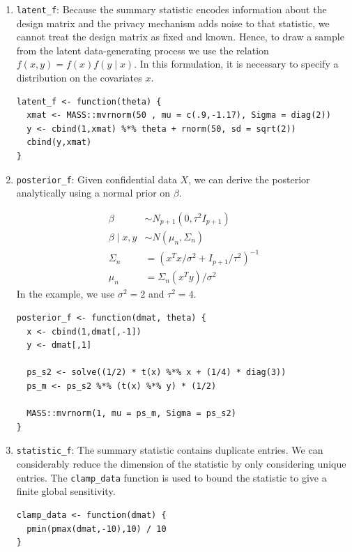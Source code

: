 \begin{enumerate}
\def\labelenumi{\arabic{enumi}.}
\item
  \texttt{latent\_f}: Because the summary statistic encodes information about the design
  matrix and the privacy mechanism adds noise to that statistic, we cannot treat the
  design matrix as fixed and known. Hence, to draw a sample from the latent data-generating
  process we use the relation \(f(x,y) = f(x)f(y \mid x)\). In this formulation,
  it is necessary to specify a distribution on the covariates \(x\).

\begin{verbatim}
latent_f <- function(theta) {
  xmat <- MASS::mvrnorm(50 , mu = c(.9,-1.17), Sigma = diag(2))
  y <- cbind(1,xmat) %*% theta + rnorm(50, sd = sqrt(2))
  cbind(y,xmat)
}
\end{verbatim}
\item
  \texttt{posterior\_f}: Given confidential data \(X\), we can derive the posterior analytically
  using a normal prior on \(\beta\).

  \begin{equation*}
   \begin{aligned}
   \beta &\sim N_{p+1}(0, \tau^2 I_{p+1})\\
   \beta \mid x,y &\sim N(\mu_n, \Sigma_n)\\
   \Sigma_n &= (x^Tx/\sigma^2 + I_{p+1}/\tau^2)^{-1}\\
   \mu_n &= \Sigma_n(x^Ty)/\sigma^2
   \end{aligned}
   \end{equation*}
  In the example, we use \(\sigma^2 = 2\) and \(\tau^2 = 4\).

\begin{verbatim}
posterior_f <- function(dmat, theta) {
  x <- cbind(1,dmat[,-1])
  y <- dmat[,1]

  ps_s2 <- solve((1/2) * t(x) %*% x + (1/4) * diag(3))
  ps_m <- ps_s2 %*% (t(x) %*% y) * (1/2)

  MASS::mvrnorm(1, mu = ps_m, Sigma = ps_s2)
}
\end{verbatim}
\item
  \texttt{statistic\_f}: The summary statistic contains duplicate
  entries. We can considerably reduce the dimension of the
  statistic by only considering unique entries. The \texttt{clamp\_data}
  function is used to bound the statistic to give a finite
  global sensitivity.

\begin{verbatim}
clamp_data <- function(dmat) {
  pmin(pmax(dmat,-10),10) / 10
}


\end{verbatim}
\end{enumerate}
